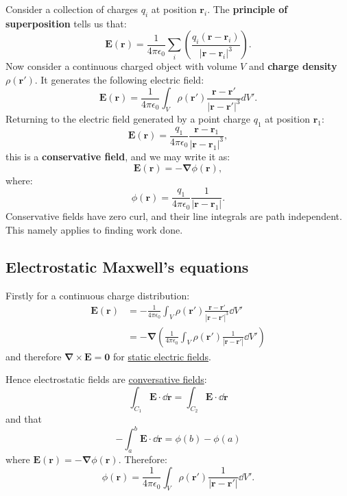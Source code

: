 \documentclass{article}
\begin{document}
Consider a collection of charges $q_i$ at position $\boldsymbol{r}_i$. The \textbf{principle of superposition} tells us that:
$$\boldsymbol{E}(\boldsymbol{r})=\frac{1}{4\pi\epsilon_0}
\sum_i \left(\frac{q_i (\boldsymbol{r}-\boldsymbol{r}_i)}
{|\boldsymbol{r}-\boldsymbol{r}_i|^3}\right).$$
Now consider a continuous charged object with volume $V$
and \textbf{charge density} $\rho(\boldsymbol{r}')$.
It generates the following electric field:
$$\boldsymbol{E}(\boldsymbol{r})=\frac{1}{4\pi\epsilon_0}
\int_V \rho(\boldsymbol{r}')\frac{\boldsymbol{r}-\boldsymbol{r}'}
{|\boldsymbol{r}-\boldsymbol{r}'|^3}dV'.$$
Returning to the electric field generated by a point charge $q_1$
at position $\boldsymbol{r}_1$:
$$\boldsymbol{E}(\boldsymbol{r})=\frac{q_1}{4\pi\epsilon_0}
\frac{\boldsymbol{r}-\boldsymbol{r}_1}{|\boldsymbol{r}-\boldsymbol{r}_1|^3},$$
this is a \textbf{conservative field}, and we may write it as:
$$\boldsymbol{E}(\boldsymbol{r})=-\boldsymbol{\nabla}\phi(\boldsymbol{r}),$$
where:
$$\phi(\boldsymbol{r})=\frac{q_1}{4\pi\epsilon_0}\frac{1}{|\boldsymbol{r}-\boldsymbol{r}_1|}.$$
Conservative fields have zero curl, and their line integrals are path independent. This namely applies to finding work done.

\newpage

\subsection{Electrostatic Maxwell's equations}

Firstly for a continuous charge distribution:
\begin{align*}
    \boldsymbol{E}(\boldsymbol{r})
    &=-\frac{1}{4\pi\epsilon_0}
    \int_V\rho(\boldsymbol{r}')
    \frac{\boldsymbol{r}-\boldsymbol{r}'}{|\boldsymbol{r}-\boldsymbol{r}'|^3}
    \dd V' \\
    &=-\boldsymbol{\nabla}
    \left(\frac{1}{4\pi\epsilon_0}
    \int_V\rho(\boldsymbol{r}')
    \frac{1}{|\boldsymbol{r}-\boldsymbol{r}'|}
    \dd V'\right)
\end{align*}
and therefore $\boldsymbol{\nabla}\times
\boldsymbol{E}=\boldsymbol{0}$ for \underline{static electric fields}.

Hence electrostatic fields are \underline{conversative fields}:
$$\int_{C_1}\boldsymbol{E}\cdot\dd\boldsymbol{r}=
\int_{C_2}\boldsymbol{E}\cdot\dd\boldsymbol{r}$$
and that
$$-\int_{a}^{b}\boldsymbol{E}\cdot\dd\boldsymbol{r}
=\phi(b)-\phi(a)$$
where $\boldsymbol{E}(\boldsymbol{r})
=-\boldsymbol{\nabla}\phi(\boldsymbol{r})$. Therefore:
$$\phi(\boldsymbol{r})
=\frac{1}{4\pi\epsilon_0}
\int_V\rho(\boldsymbol{r}')
\frac{1}{|\boldsymbol{r}-\boldsymbol{r}'|}
\dd V'.$$
\end{document}

